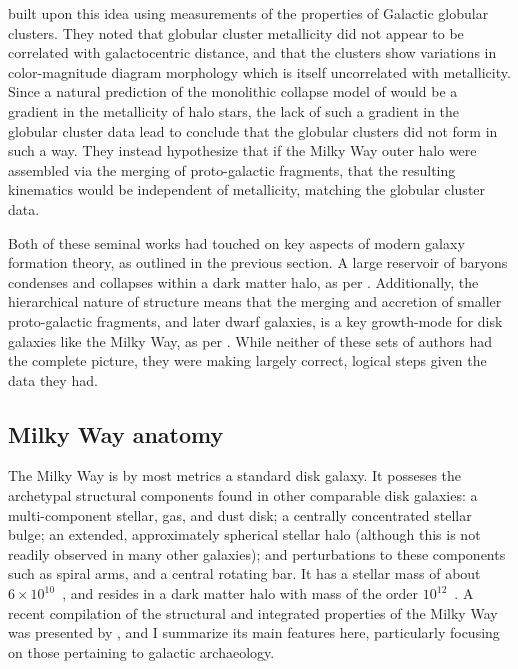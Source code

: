 \textcite{searle78} built upon this idea using measurements of the properties of Galactic globular clusters. They noted that globular cluster metallicity did not appear to be correlated with galactocentric distance, and that the clusters show variations in color-magnitude diagram morphology which is itself uncorrelated with metallicity. Since a natural prediction of the monolithic collapse model of \textcite{eggen62} would be a gradient in the metallicity of halo stars, the lack of such a gradient in the globular cluster data lead \textcite{searle78} to conclude that the globular clusters did not form in such a way. They instead hypothesize that if the Milky Way outer halo were assembled via the merging of proto-galactic fragments, that the resulting kinematics would be independent of metallicity, matching the globular cluster data.

Both of these seminal works had touched on key aspects of modern galaxy formation theory, as outlined in the previous section. A large reservoir of baryons condenses and collapses within a dark matter halo, as per \textcite{eggen62}. Additionally, the hierarchical nature of structure means that the merging and accretion of smaller proto-galactic fragments, and later dwarf galaxies, is a key growth-mode for disk galaxies like the Milky Way, as per \textcite{searle78}. While neither of these sets of authors had the complete picture, they were making largely correct, logical steps given the data they had.

\subsection{Milky Way anatomy}

The Milky Way is by most metrics a standard disk galaxy. It posseses the archetypal structural components found in other comparable disk galaxies: a multi-component stellar, gas, and dust disk; a centrally concentrated stellar bulge; an extended, approximately spherical stellar halo (although this is not readily observed in many other galaxies); and perturbations to these components such as spiral arms, and a central rotating bar. It has a stellar mass of about $6\times10^{10}$~\Msun, and resides in a dark matter halo with mass of the order $10^{12}$~\Msun.  A recent compilation of the structural and integrated properties of the Milky Way was presented by \textcite{bland-hawthorn16}, and I summarize its main features here, particularly focusing on those pertaining to galactic archaeology.

